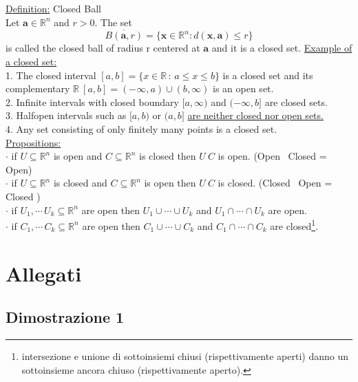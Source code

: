 \documentclass[a4paper,11pt]{article}
\begin{document}
\underline{Definition:} Closed Ball \\
Let $\mathbf{a } \in \mathbb{R}^n $ and $r > 0$. The set 
$$\overline{B(\mathbf{a},r)} = \{ \mathbf{x} \in \mathbb{R}^n : d(\mathbf{x,a}) \leq r\} $$
is called the closed ball of radius r centered at $\mathbf{a} $ and it is a closed set.
\underline{Example of a closed set:} \\
1. The closed interval $[a,b] = \{x \in \mathbb{R} \, : \, a \leq x \leq b\}$ is a closed set and its complementary $\mathbb{R} \ [a,b] = (-\infty,a) \cup (b,\infty) $ is an open set. \\
2. Infinite intervals with closed boundary $[a,\infty)$ and $(-\infty,b] $ are closed sets. \\
3. Halfopen intervals such as $[a,b)$ or $(a,b]$ \underline{are neither closed nor open sets.} \\
4. Any set consisting of only finitely many points is a closed set. \\
\underline{Propositions:} \\
$\cdot$ if $U \subseteq \mathbb{R}^n$ is open and $C \subseteq \mathbb{R}^n$ is closed then $U \ C$ is open.  (Open \ Closed = Open)   \\
$\cdot$ if $U \subseteq \mathbb{R}^n$ is closed and $C \subseteq \mathbb{R}^n$ is open then $U \ C$ is closed.  (Closed \ Open = Closed )  \\
$\cdot$ if $U_1 , \cdots \, U_k \subseteq \mathbb{R}^n $ are open then $U_1 \cup \cdots \cup U_k$ and $U_1 \cap \cdots \cap U_k$ are open. \\
$\cdot$ if $C_1 , \cdots \, C_k \subseteq \mathbb{R}^n $ are open then $C_1 \cup \cdots \cup C_k$ and $C_1 \cap \cdots \cap C_k$ are closed\footnote{intersezione e unione di sottoinsiemi chiusi (rispettivamente aperti) danno un sottoinsieme ancora chiuso (rispettivamente aperto).}. \\ 







\pagebreak



\section{Allegati}
\label{sec:allegati}
\subsection{Dimostrazione 1}
\label{sec:Dimostrazione 1}
\end{document}
